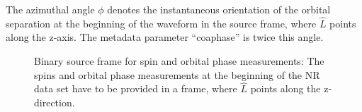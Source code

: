 \documentclass[aps,prd,amssymb,amsmath,amsfonts,superscriptaddress,
floatfix ,preprintnumbers,altaffilletter]{revtex4}
\begin{document}
The azimuthal angle $\phi$ denotes the instantaneous orientation of the orbital separation at the beginning of the waveform in the source frame, where $\hat{L}$ points along the z-axis. The metadata parameter ``coa\textunderscore phase'' is twice this angle.

\begin{figure}[!h]
\begin{center}
\def\svgwidth{0.4\columnwidth}

\caption{Binary source frame for spin and orbital phase measurements: The spins and orbital phase measurements at the
beginning of the NR data set have to be provided in a frame, where $\hat{L}$ points along the z-direction.}  
\label{fig:source}
\end{center}
\end{figure}




\end{document}
